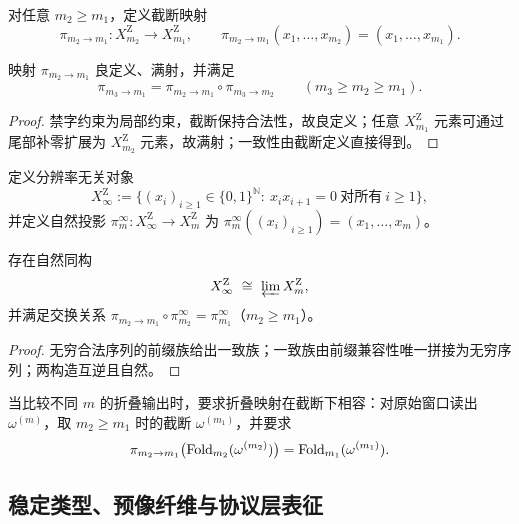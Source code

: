 \begin{definition}[尺度投影（截断）]\label{def:static-pi}
对任意 $m_2\ge m_1$，定义截断映射
\[
\pi_{m_2\to m_1}:X_{m_2}^{\mathrm Z}\to X_{m_1}^{\mathrm Z},\qquad
\pi_{m_2\to m_1}(x_1,\dots,x_{m_2})=(x_1,\dots,x_{m_1}).
\]
\end{definition}

\begin{lemma}[良定性与一致性]\label{lem:static-pi-basic}
映射 $\pi_{m_2\to m_1}$ 良定义、满射，并满足
\[
\pi_{m_3\to m_1}=\pi_{m_2\to m_1}\circ \pi_{m_3\to m_2}\qquad (m_3\ge m_2\ge m_1).
\]
\end{lemma}

\begin{proof}
禁字约束为局部约束，截断保持合法性，故良定义；任意 $X_{m_1}^{\mathrm Z}$ 元素可通过尾部补零扩展为 $X_{m_2}^{\mathrm Z}$ 元素，故满射；一致性由截断定义直接得到。
\end{proof}

\begin{definition}\label{def:static-XinfZ}
定义分辨率无关对象
\[
X_\infty^{\mathrm Z}:=\{(x_i)_{i\ge 1}\in\{0,1\}^{\mathbb{N}}:\ x_ix_{i+1}=0\ \text{对所有}\ i\ge 1\},
\]
并定义自然投影 $\pi_m^\infty:X_\infty^{\mathrm Z}\to X_m^{\mathrm Z}$ 为 $\pi_m^\infty((x_i)_{i\ge 1})=(x_1,\dots,x_m)$。
\end{definition}

\begin{theorem}\label{thm:static-inverse-limit}
存在自然同构
\[
X_\infty^{\mathrm Z}\ \cong\ \varprojlim X_m^{\mathrm Z},
\]
并满足交换关系 $\pi_{m_2\to m_1}\circ \pi_{m_2}^\infty=\pi_{m_1}^\infty$（$m_2\ge m_1$）。
\end{theorem}

\begin{proof}
无穷合法序列的前缀族给出一致族；一致族由前缀兼容性唯一拼接为无穷序列；两构造互逆且自然。
\end{proof}

\begin{assumption}\label{assump:static-readout-factorization}
当比较不同 $m$ 的折叠输出时，要求折叠映射在截断下相容：对原始窗口读出 $\omega^{(m)}$，取 $m_2\ge m_1$ 时的截断 $\omega^{(m_1)}$，并要求
\[
\pi_{m_2\to m_1}\bigl(\mathrm{Fold}_{m_2}(\omega^{(m_2)})\bigr)=\mathrm{Fold}_{m_1}(\omega^{(m_1)}).
\]
\end{assumption}

\subsection{稳定类型、预像纤维与协议层表征}

